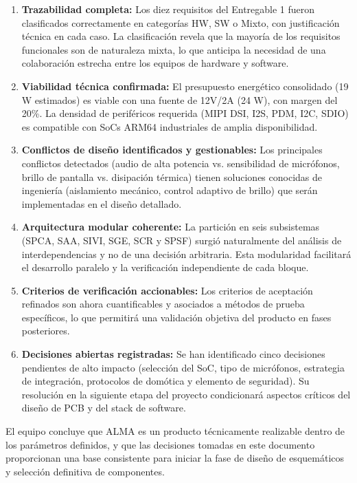 \documentclass[%
	paper=a4,
	twoside=false,
	parskip=half,
	chapterprefix=false,
	10pt,
	headings=normal,
	bibliography=totoc,
	listof=totoc,
	titlepage=on,
	captions=tableabove,
	draft=false, 
]{scrbook}%
\begin{document}
\begin{enumerate}
    \item \textbf{Trazabilidad completa:} Los diez requisitos del Entregable 1 fueron clasificados correctamente en categorías HW, SW o Mixto, con justificación técnica en cada caso. La clasificación revela que la mayoría de los requisitos funcionales son de naturaleza mixta, lo que anticipa la necesidad de una colaboración estrecha entre los equipos de hardware y software.

    \item \textbf{Viabilidad técnica confirmada:} El presupuesto energético consolidado (19 W estimados) es viable con una fuente de 12V/2A (24 W), con margen del 20\%. La densidad de periféricos requerida (MIPI DSI, I2S, PDM, I2C, SDIO) es compatible con SoCs ARM64 industriales de amplia disponibilidad.

    \item \textbf{Conflictos de diseño identificados y gestionables:} Los principales conflictos detectados (audio de alta potencia vs. sensibilidad de micrófonos, brillo de pantalla vs. disipación térmica) tienen soluciones conocidas de ingeniería (aislamiento mecánico, control adaptivo de brillo) que serán implementadas en el diseño detallado.

    \item \textbf{Arquitectura modular coherente:} La partición en seis subsistemas (SPCA, SAA, SIVI, SGE, SCR y SPSF) surgió naturalmente del análisis de interdependencias y no de una decisión arbitraria. Esta modularidad facilitará el desarrollo paralelo y la verificación independiente de cada bloque.

    \item \textbf{Criterios de verificación accionables:} Los criterios de aceptación refinados son ahora cuantificables y asociados a métodos de prueba específicos, lo que permitirá una validación objetiva del producto en fases posteriores.

    \item \textbf{Decisiones abiertas registradas:} Se han identificado cinco decisiones pendientes de alto impacto (selección del SoC, tipo de micrófonos, estrategia de integración, protocolos de domótica y elemento de seguridad). Su resolución en la siguiente etapa del proyecto condicionará aspectos críticos del diseño de PCB y del stack de software.
\end{enumerate}

El equipo concluye que ALMA es un producto técnicamente realizable dentro de los parámetros definidos, y que las decisiones tomadas en este documento proporcionan una base consistente para iniciar la fase de diseño de esquemáticos y selección definitiva de componentes.
\end{document}
